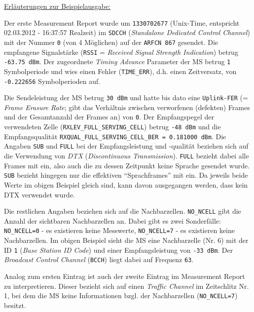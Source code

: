 \underline{Erläuterungen zur Beispielausgabe:}

Der erste Measurement Report wurde um \verb|1330702677| (Unix-Time, entspricht 02.03.2012 - 16:37:57 Realzeit) im \verb|SDCCH| (\textit{Standalone Dedicated Control Channel}) mit der Nummer \verb|0| (von 4 Möglichen) auf der \verb|ARFCN 867| gesendet. Die empfangene Signalstärke (\verb|RSSI| = \textit{Received Signal Strength Indication}) betrug \verb|-63.75 dBm|. Der zugeordnete \textit{Timing Advance} Parameter der MS betrug \verb|1| Symbolperiode und wies einen Fehler (\verb|TIME_ERR|), d.h. einen Zeitversatz, von \verb|-0.222656| Symbolperioden auf.

Die Sendeleistung der MS betrug \verb|30 dBm| und hatte bis dato eine \verb|Uplink-FER| (= \textit{Frame Erasure Rate}; gibt das Verhältnis zwischen verworfenen (defekten) Frames und der Gesamtanzahl der Frames an) von \verb|0|. Der Empfangspegel der verwendeten Zelle (\verb|RXLEV_FULL_SERVING_CELL|) betrug \verb|-48 dBm| und die Empfangsqualität \verb|RXQUAL_FULL_SERVING_CELL_BER = 0.181000 dBm|. Die Angaben \verb|SUB| und \verb|FULL| bei der Empfangsleistung und -qualität beziehen sich auf die Verwendung von \textit{DTX} (\textit{Discontinuous Transmission}). \verb|FULL| bezieht dabei alle Frames mit ein, also auch die zu dessen Zeitpunkt keine Sprache gesendet wurde. \verb|SUB| bezieht hingegen nur die effektiven "`Sprachframes"' mit ein. Da jeweils beide Werte im obigen Beispiel gleich sind, kann davon ausgegangen werden, dass kein DTX verwendet wurde. 

Die restlichen Angaben beziehen sich auf die Nachbarzellen. \verb|NO_NCELL| gibt die Anzahl der sichtbaren Nachbarzellen an. Dabei gibt es zwei Sonderfälle: \verb|NO_NCELL=0| - es existieren keine Messwerte, \verb|NO_NCELL=7| - es existieren keine Nachbarzellen. Im obigen Beispiel sieht die MS eine Nachbarzelle (Nr. 6) mit der ID \verb|1| (\textit{Base Station ID Code}) und einer Empfangsleistung von \verb|-33 dBm|. Der \textit{Broadcast Control Channel} (\verb|BCCH|) liegt dabei auf Frequenz \verb|63|.

Analog zum ersten Eintrag ist auch der zweite Eintrag im Measurement Report zu interpretieren. Dieser bezieht sich auf einen \textit{Traffic Channel} im Zeitschlitz Nr. 1, bei dem die MS keine Informationen bzgl. der Nachbarzellen (\verb|NO_NCELL=7|) besitzt.